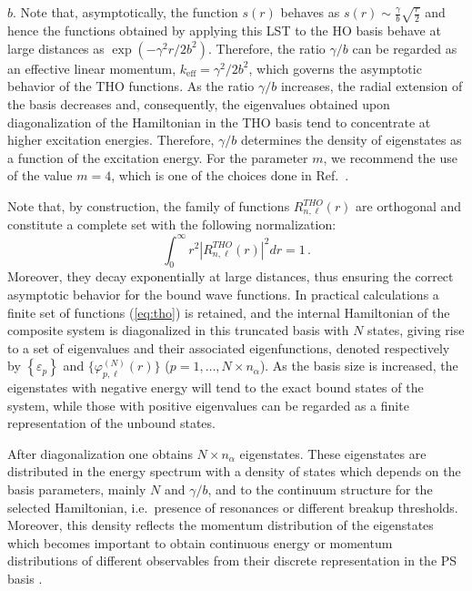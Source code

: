 \documentclass[preprint,12pt]{elsarticle}
\begin{document}
$b$. Note that,  
asymptotically, the function  $s(r)$ behaves as 
$s(r)\sim \frac{\gamma}{b} \sqrt{\frac{r}{2}}$
and hence the functions obtained by applying this LST to the HO basis
behave at  
large distances as $\exp(-\gamma^2 r / 2 b^2)$. Therefore, the ratio
$\gamma/b$ can be regarded as  an effective linear momentum, 
$k_\mathrm{eff}=\gamma^2 /2 b^2$, which  
governs the asymptotic behavior of the THO functions. As the ratio
$\gamma/b$ increases, the radial extension of the basis decreases and,  
consequently, the eigenvalues obtained upon diagonalization of the
Hamiltonian in the THO basis tend to concentrate at higher excitation
energies. Therefore, $\gamma/b$ determines the density of eigenstates
as a function of the excitation energy. For the parameter $m$, we recommend the use of 
the value $m=4$, which is one of the choices done in  Ref.~\cite{Amos}. 


Note that, by construction, the family of functions  
\( R ^{THO}_{n, \ell}(r) \) are orthogonal
and constitute a complete set with the following normalization: 
\begin{equation}
 \int_{0}^{\infty} r^2 | R ^{THO}_{n, \ell}(r)|^{2} dr=1  \, .
\end{equation} 
Moreover, they decay exponentially
at large distances, thus ensuring the correct asymptotic behavior
for the bound wave functions. In practical calculations a finite set
of functions (\ref{eq:tho})  
is retained, and the internal Hamiltonian of the composite system is
diagonalized in this truncated basis with $N$ states,  
giving rise to a set of  eigenvalues and their associated
eigenfunctions, denoted respectively by $\left\{\varepsilon_p \right\}$ and 
$\{\varphi^{(N)}_{p, \ell}(r)\}$ ($p=1,\ldots,N \times n_\alpha$). As the basis size
is increased,  the eigenstates with negative energy
will tend to the exact bound states of the system, while those
with positive eigenvalues can be regarded as a finite representation
of the unbound states. 

After diagonalization one obtains $N \times n_\alpha$ eigenstates. 
These eigenstates are distributed in the energy spectrum with a density of states which depends on the basis parameters, mainly  $N$ and $\gamma / b$, and to the continuum structure for the selected Hamiltonian, i.e.\ presence of resonances or different breakup thresholds. Moreover, this density reflects the momentum distribution of the eigenstates which becomes important to obtain 
continuous energy or momentum distributions of different observables from their discrete representation in the PS basis \cite{Mat03,Tos01,Mor09,Lay10}. 
\end{document}
